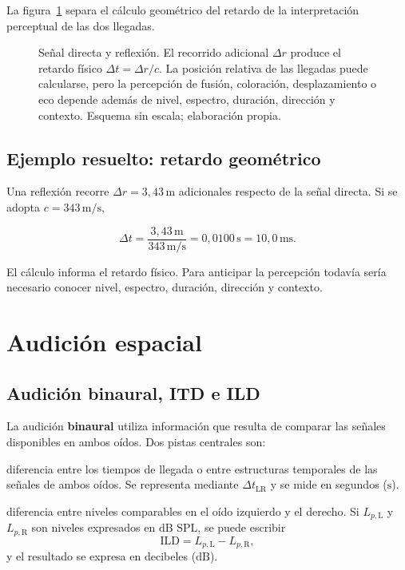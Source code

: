 La figura~\ref{fig:u7-precedencia-reflexiones} separa el cálculo geométrico del
retardo de la interpretación perceptual de las dos llegadas.

\begin{figure}[htbp]
    \centering
    
    \caption{Señal directa y reflexión. El recorrido adicional
    \(\Delta r\) produce el retardo físico
    \(\Delta t=\Delta r/c\). La posición relativa de las llegadas puede
    calcularse, pero la percepción de fusión, coloración, desplazamiento o eco
    depende además de nivel, espectro, duración, dirección y contexto. Esquema
    sin escala; elaboración propia.}
    \label{fig:u7-precedencia-reflexiones}
\end{figure}

\subsection{Ejemplo resuelto: retardo geométrico}
\label{sec:u7-ejemplo-reflexion}

Una reflexión recorre \(\Delta r=3{,}43\,\text{m}\) adicionales respecto de
la señal directa. Si se adopta \(c=343\,\text{m}/\text{s}\),

\[
    \Delta t
      =\frac{3{,}43\,\text{m}}{343\,\text{m}/\text{s}}
      =0{,}0100\,\text{s}
      =10{,}0\,\text{ms}.
\]

El cálculo informa el retardo físico. Para anticipar la percepción todavía
sería necesario conocer nivel, espectro, duración, dirección y contexto.

\section{Audición espacial}
\label{sec:u7-audicion-espacial}

\subsection{Audición binaural, ITD e ILD}
\label{sec:u7-itd-ild}

La audición \textbf{binaural} utiliza información que resulta de comparar las
señales disponibles en ambos oídos. Dos pistas centrales son:

\begin{description}[style=nextline]
    \item[\textbf{Diferencia interaural de tiempo (ITD):}]
    diferencia entre los tiempos de llegada o entre estructuras temporales de
    las señales de ambos oídos. Se representa mediante
    \(\Delta t_\mathrm{LR}\) y se mide en segundos (\(\text{s}\)).

    \item[\textbf{Diferencia interaural de nivel (ILD):}]
    diferencia entre niveles comparables en el oído izquierdo y el derecho.
    Si \(L_{p,\mathrm{L}}\) y \(L_{p,\mathrm{R}}\) son niveles expresados en
    \(\text{dB SPL}\), se puede escribir
    \[
        \mathrm{ILD}=L_{p,\mathrm{L}}-L_{p,\mathrm{R}},
    \]
    y el resultado se expresa en decibeles (\(\text{dB}\)).
\end{description}

